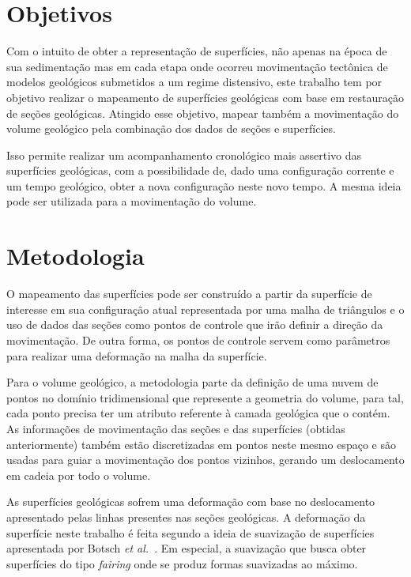 \section{Objetivos}

Com o intuito de obter a representação de superfícies, não apenas na época de sua sedimentação mas em cada etapa onde ocorreu movimentação tectônica de modelos geológicos submetidos a um regime distensivo, este trabalho tem por objetivo realizar o mapeamento de superfícies geológicas com base em restauração de seções geológicas. Atingido esse objetivo, mapear também a movimentação do volume geológico pela combinação dos dados de seções e superfícies.

Isso permite realizar um acompanhamento cronológico mais assertivo das superfícies geológicas, com a possibilidade de, dado uma configuração corrente e um tempo geológico, obter a nova configuração neste novo tempo. A mesma ideia pode ser utilizada para a movimentação do volume.

\section{Metodologia}

O mapeamento das superfícies pode ser construído a partir da superfície de interesse em sua configuração atual representada por uma malha de triângulos e o uso de dados das seções como pontos de controle que irão definir a direção da movimentação. De outra forma, os pontos de controle servem como parâmetros para realizar uma deformação na malha da superfície.

Para o volume geológico, a metodologia parte da definição de uma nuvem de pontos no domínio tridimensional que represente a geometria do volume, para tal, cada ponto precisa ter um atributo referente à camada geológica que o contém. As informações de movimentação das seções e das superfícies (obtidas anteriormente) também estão discretizadas em pontos neste mesmo espaço e são usadas para guiar a movimentação dos pontos vizinhos, gerando um deslocamento em cadeia por todo o volume.

As superfícies geológicas sofrem uma deformação com base no deslocamento apresentado pelas linhas presentes nas seções geológicas. A deformação da superfície neste trabalho é feita segundo a ideia de suavização de superfícies apresentada por Botsch \emph{et al.}~\cite{Botsch}. Em especial, a suavização que busca obter superfícies do tipo \emph{fairing} onde se produz formas suavizadas ao máximo.

